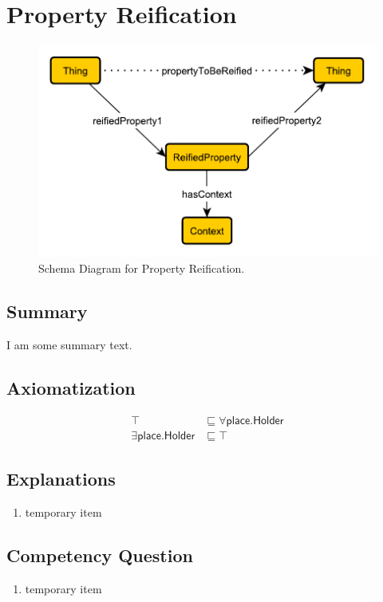 \section{Property Reification}
\label{sec:Property}
\begin{figure}[h!]
\begin{center}
\includegraphics[width=.4\textwidth]{figures/reification}
\end{center}
\caption{Schema Diagram for Property Reification.}
\label{fig:Property}
\end{figure}
\subsection{Summary}
\label{sum:Property}
I am some summary text.

\subsection{Axiomatization}
\label{axs:Property}
\begin{align}
\top &\sqsubseteq \forall\textsf{place.Holder} \\ 
\exists\textsf{place.Holder} &\sqsubseteq \top 
\end{align}

\subsection{Explanations}
\label{exp:Property}
\begin{enumerate}
\item temporary item
\end{enumerate}

\subsection{Competency Question}
\label{cqs:Property}
\begin{enumerate}[CQ1.]
\item temporary item
\end{enumerate}

\newpage
